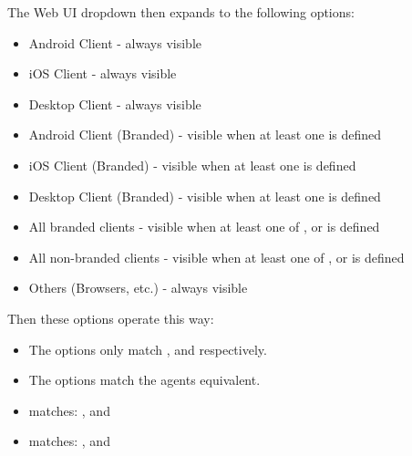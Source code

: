 \documentclass[letterpaper,10pt,english]{sphinxmanual}
\begin{document}
The Web UI dropdown then expands to the following options:
\begin{itemize}
\item {} 
Android Client - always visible

\item {} 
iOS Client - always visible

\item {} 
Desktop Client - always visible

\item {} 
Android Client (Branded) - visible when at least one  is defined

\item {} 
iOS Client (Branded) - visible when at least one  is defined

\item {} 
Desktop Client (Branded) - visible when at least one  is defined

\item {} 
All branded clients - visible when at least one of ,
 or  is defined

\item {} 
All non-branded clients - visible when at least one of ,
 or  is defined

\item {} 
Others (Browsers, etc.) - always visible

\end{itemize}

Then these options operate this way:
\begin{itemize}
\item {} 
The  options only match ,  and  respectively.

\item {} 
The  options match the  agents equivalent.

\item {} 
 matches: ,  and

\item {} 
 matches: ,  and 

\end{itemize}
\end{document}
